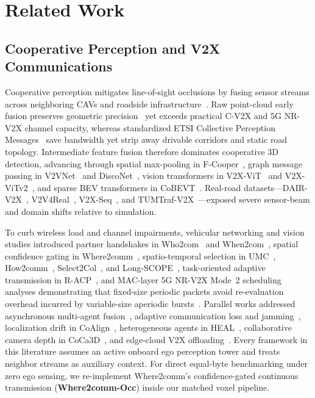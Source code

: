 \documentclass[journal]{IEEEtran}
\begin{document}
\section{Related Work}
\label{sec:related}

\subsection{Cooperative Perception and V2X Communications}

Cooperative perception mitigates line-of-sight occlusions by fusing sensor streams across neighboring CAVs and roadside infrastructure~\cite{chen2019cooper,xu2022opv2v,yu2022dairv2x,li2022v2xsim,bai2024survey}. Raw point-cloud early fusion preserves geometric precision~\cite{chen2019cooper} yet exceeds practical C-V2X and 5G NR-V2X channel capacity, whereas standardized ETSI Collective Perception Messages~\cite{etsi2023cpm} save bandwidth yet strip away drivable corridors and static road topology. Intermediate feature fusion therefore dominates cooperative 3D detection, advancing through spatial max-pooling in F-Cooper~\cite{chen2019fcooper}, graph message passing in V2VNet~\cite{wang2020v2vnet} and DiscoNet~\cite{li2021disconet}, vision transformers in V2X-ViT~\cite{xu2022v2xvit} and V2X-ViTv2~\cite{xu2025v2xvitv2}, and sparse BEV transformers in CoBEVT~\cite{xu2022cobevt}. Real-road datasets---DAIR-V2X~\cite{yu2022dairv2x}, V2V4Real~\cite{xu2023v2v4real}, V2X-Seq~\cite{yu2023v2xseq}, and TUMTraf-V2X~\cite{zimmer2024tumtraf}---exposed severe sensor-beam and domain shifts relative to simulation.

To curb wireless load and channel impairments, vehicular networking and vision studies introduced partner handshakes in Who2com~\cite{liu2020who2com} and When2com~\cite{liu2020when2com}, spatial confidence gating in Where2comm~\cite{hu2022where2comm}, spatio-temporal selection in UMC~\cite{wang2023umc}, How2comm~\cite{yang2023how2comm}, Select2Col~\cite{liu2024select2col}, and Long-SCOPE~\cite{wang2026longscope}, task-oriented adaptive transmission in R-ACP~\cite{fang2025racp}, and MAC-layer 5G NR-V2X Mode~2 scheduling analyses demonstrating that fixed-size periodic packets avoid re-evaluation overhead incurred by variable-size aperiodic bursts~\cite{molina2024reeval}. Parallel works addressed asynchronous multi-agent fusion~\cite{dao2024practical,lei2022syncnet}, adaptive communication loss and jamming~\cite{shi2025adaptive,lin2025jamming}, localization drift in CoAlign~\cite{lu2023coalign}, heterogeneous agents in HEAL~\cite{lu2024heal}, collaborative camera depth in CoCa3D~\cite{hu2023coca3d}, and edge-cloud V2X offloading~\cite{hawlader2024edge,hawlader2026bandwidth}. Every framework in this literature assumes an active onboard ego perception tower and treats neighbor streams as auxiliary context. For direct equal-byte benchmarking under zero ego sensing, we re-implement Where2comm's confidence-gated continuous transmission (\textbf{Where2comm-Occ}) inside our matched voxel pipeline.
\end{document}
